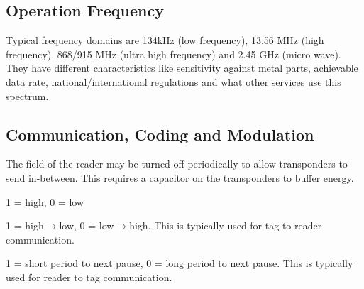 \subsection{Operation Frequency}
\begin{mytitle} Typical frequency domains are 134kHz (low frequency), 13.56 MHz (high frequency), 868/915 MHz (ultra high frequency) and 2.45 GHz (micro wave). They have different characteristics like sensitivity against metal parts, achievable data rate, national/international regulations and what other services use this spectrum.
\end{mytitle}


\subsection{Communication, Coding and Modulation}
\begin{mytitle} The field of the reader may be turned off periodically to allow transponders to send in-between. This requires a capacitor on the transponders to buffer energy.
\end{mytitle}
\begin{mytitle} 
    \begin{mysubtitle}[NRZ] 1 = high, 0 = low
    \end{mysubtitle}
    \begin{mysubtitle}[Manchester] 1 = high$\to$low, 0 = low$\to$high. This is typically used for tag to reader communication.
    \end{mysubtitle}
    \begin{mysubtitle} 1 = short period to next pause, 0 = long period to next pause. This is typically used for reader to tag communication.
    \end{mysubtitle}
\end{mytitle}

